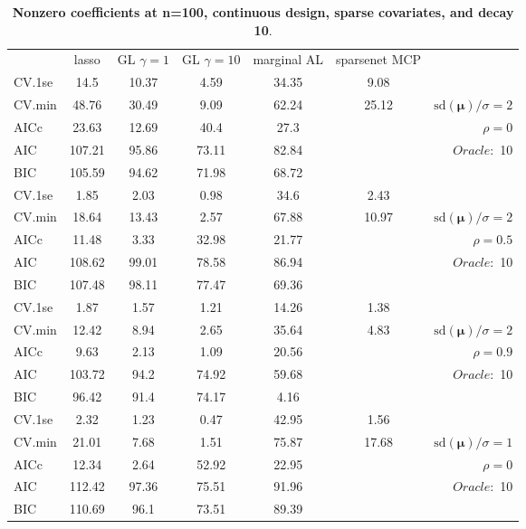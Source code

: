 \clearpage
\begin{table}\vspace{-.5cm}
\caption[l]{ { \bf Nonzero coefficients at n=100, continuous design, 
sparse covariates, and  decay  10}.}
\vspace{-.5cm}
\footnotesize{}
\begin{center}
\begin{tabular}{l*{5}{c}|r}
& lasso & GL $\gamma=1$ & GL $\gamma=10$ & marginal AL & sparsenet MCP  & \\
 \cline{1-7}
CV.1se & 14.5 & 10.37 & 4.59 & 34.35 & 9.08 & \\
CV.min & 48.76 & 30.49 & 9.09 & 62.24 & 25.12 &  $\mathrm{sd}(\mathbf{\mu})/\sigma=2$ \\
AICc & 23.63 & 12.69 & 40.4 & 27.3 & & $\rho=0$ \\
AIC & 107.21 & 95.86 & 73.11 & 82.84 & &  \multirow{2}{*}{$Oracle: $ 10} \\
BIC & 105.59 & 94.62 & 71.98 & 68.72 & &  \\
 \hline 
CV.1se & 1.85 & 2.03 & 0.98 & 34.6 & 2.43 & \\
CV.min & 18.64 & 13.43 & 2.57 & 67.88 & 10.97 &  $\mathrm{sd}(\mathbf{\mu})/\sigma=2$ \\
AICc & 11.48 & 3.33 & 32.98 & 21.77 & & $\rho=0.5$ \\
AIC & 108.62 & 99.01 & 78.58 & 86.94 & &  \multirow{2}{*}{$Oracle: $ 10} \\
BIC & 107.48 & 98.11 & 77.47 & 69.36 & &  \\
 \hline 
CV.1se & 1.87 & 1.57 & 1.21 & 14.26 & 1.38 & \\
CV.min & 12.42 & 8.94 & 2.65 & 35.64 & 4.83 &  $\mathrm{sd}(\mathbf{\mu})/\sigma=2$ \\
AICc & 9.63 & 2.13 & 1.09 & 20.56 & & $\rho=0.9$ \\
AIC & 103.72 & 94.2 & 74.92 & 59.68 & &  \multirow{2}{*}{$Oracle: $ 10} \\
BIC & 96.42 & 91.4 & 74.17 & 4.16 & &  \\
 \hline 
CV.1se & 2.32 & 1.23 & 0.47 & 42.95 & 1.56 & \\
CV.min & 21.01 & 7.68 & 1.51 & 75.87 & 17.68 &  $\mathrm{sd}(\mathbf{\mu})/\sigma=1$ \\
AICc & 12.34 & 2.64 & 52.92 & 22.95 & & $\rho=0$ \\
AIC & 112.42 & 97.36 & 75.51 & 91.96 & &  \multirow{2}{*}{$Oracle: $ 10} \\
BIC & 110.69 & 96.1 & 73.51 & 89.39 & &  \\

\end{tabular}
\end{center}
\end{table}
